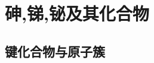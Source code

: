 \documentclass{ctexart}
\begin{document}
\section{砷,锑,铋及其化合物}
\subsection{键化合物与原子簇}
\subsubsection{}
\end{document}
